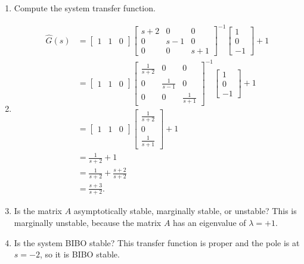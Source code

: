 \documentclass[10pt]{article}
\begin{document}
\begin{enumerate}[label=(\alph*)]
\item Compute the system transfer function.
\item[]
\begin{equation*}
\begin{split}
\hat{G}(s) &=
\begin{bmatrix}
  1 & 1 & 0
\end{bmatrix}
\begin{bmatrix}
  s+2 & 0 & 0 \\ 0 & s-1 & 0 \\ 0 & 0 & s+1
\end{bmatrix}^{-1}
\begin{bmatrix}
  1 \\ 0 \\ -1
\end{bmatrix} + 1\\
&= 
\begin{bmatrix}
  1 & 1 & 0
\end{bmatrix}
\begin{bmatrix}
  \frac{1}{s+2} & 0 & 0 \\ 0 & \frac{1}{s-1} & 0 \\ 0 & 0 & \frac{1}{s+1}
\end{bmatrix}^{-1}
\begin{bmatrix}
  1 \\ 0 \\ -1
\end{bmatrix} + 1\\
& =
\begin{bmatrix}
  1 & 1 & 0
\end{bmatrix}
\begin{bmatrix}
  \frac{1}{s+2} \\ 0 \\ \frac{1}{s+1}
\end{bmatrix}+1\\
& = \frac{1}{s+2} + 1 \\ 
&= \frac{1}{s+2} + \frac{s+2}{s+2} \\
&= \frac{s+3}{s+2}.
\end{split}
\end{equation*}
\item Is the matrix $A$ asymptotically stable, marginally stable, or unstable?
This is marginally unstable, because the matrix $A$ has an eigenvalue
of $\lambda = +1$.
\item Is the system BIBO stable?
This transfer function is proper and the pole is at $s= -2$, so it is
BIBO stable.

\end{enumerate}
\end{document}
